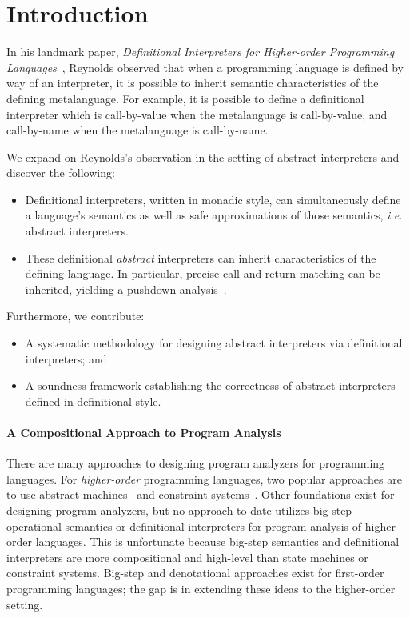 \section{Introduction}

In his landmark paper, \emph{Definitional Interpreters for Higher-order
Programming Languages}~\cite{dvanhorn:reynolds-acm72}, Reynolds observed that
when a programming language is defined by way of an interpreter, it is possible
to inherit semantic characteristics of the defining metalanguage. For example,
it is possible to define a definitional interpreter which is call-by-value when
the metalanguage is call-by-value, and call-by-name when the metalanguage is
call-by-name.

We expand on Reynolds's observation in the setting of abstract interpreters and
discover the following:
\begin{itemize}
\item Definitional interpreters, written in monadic style, can simultaneously
  define a language's semantics as well as safe approximations of those
  semantics, \emph{i.e.} abstract interpreters.
\item These definitional \emph{abstract} interpreters can inherit
  characteristics of the defining language.  In particular, precise
  call-and-return matching can be inherited, yielding a pushdown
  analysis~\cite{dvanhorn:Earl2010Pushdown,local:vardoulakis-diss12}.
\end{itemize}
Furthermore, we contribute:
\begin{itemize}
\item A systematic methodology for designing abstract interpreters via
  definitional interpreters; and
\item A soundness framework establishing the correctness of abstract
  interpreters defined in definitional style.
\end{itemize}

\paragraph{A Compositional Approach to Program Analysis}
There are many approaches to designing program analyzers for programming
languages. For \emph{higher-order} programming languages, two popular
approaches are to use abstract machines~\cite{dvanhorn:VanHorn2010Abstracting}
and constraint systems~\cite{dvanhorn:Neilson:1999}. Other foundations exist
for designing program analyzers, but no approach to-date utilizes big-step
operational semantics or definitional interpreters for program analysis of
higher-order languages. This is unfortunate because big-step semantics and
definitional interpreters are more compositional and high-level than state
machines or constraint systems. Big-step and denotational approaches exist for
first-order programming languages; the gap is in extending these ideas to the
higher-order setting.

